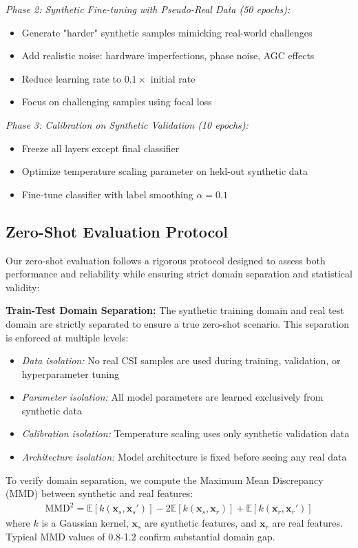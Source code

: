\documentclass[journal]{IEEEtran}
\begin{document}
\textit{Phase 2: Synthetic Fine-tuning with Pseudo-Real Data (50 epochs):}
\begin{itemize}
\item Generate "harder" synthetic samples mimicking real-world challenges
\item Add realistic noise: hardware imperfections, phase noise, AGC effects
\item Reduce learning rate to $0.1 \times$ initial rate
\item Focus on challenging samples using focal loss
\end{itemize}

\textit{Phase 3: Calibration on Synthetic Validation (10 epochs):}
\begin{itemize}
\item Freeze all layers except final classifier
\item Optimize temperature scaling parameter on held-out synthetic data
\item Fine-tune classifier with label smoothing $\alpha = 0.1$
\end{itemize}

\subsection{Zero-Shot Evaluation Protocol}
Our zero-shot evaluation follows a rigorous protocol designed to assess both performance and reliability while ensuring strict domain separation and statistical validity:

\textbf{Train-Test Domain Separation:} 
The synthetic training domain and real test domain are strictly separated to ensure a true zero-shot scenario. This separation is enforced at multiple levels:
\begin{itemize}
\item \textit{Data isolation:} No real CSI samples are used during training, validation, or hyperparameter tuning
\item \textit{Parameter isolation:} All model parameters are learned exclusively from synthetic data
\item \textit{Calibration isolation:} Temperature scaling uses only synthetic validation data
\item \textit{Architecture isolation:} Model architecture is fixed before seeing any real data
\end{itemize}

To verify domain separation, we compute the Maximum Mean Discrepancy (MMD) between synthetic and real features:
\begin{align}
\text{MMD}^2 = \mathbb{E}[k(\mathbf{x}_s, \mathbf{x}_s')] - 2\mathbb{E}[k(\mathbf{x}_s, \mathbf{x}_r)] + \mathbb{E}[k(\mathbf{x}_r, \mathbf{x}_r')]
\end{align}
where $k$ is a Gaussian kernel, $\mathbf{x}_s$ are synthetic features, and $\mathbf{x}_r$ are real features. Typical MMD values of 0.8-1.2 confirm substantial domain gap.
\end{document}
